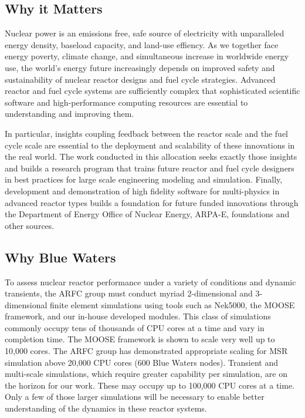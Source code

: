 \documentclass[letterpaper]{article}
\begin{document}
\subsection{Why it Matters} 


Nuclear power is an emissions free, safe source of electricity with
unparalleled energy density, baseload capacity, and land-use effiency. 
As we together face energy poverty, climate change, and simultaneous increase
in worldwide energy use, the world's energy future increasingly depends on
improved safety and sustainability of nuclear reactor designs and fuel cycle
strategies. Advanced reactor and fuel cycle systems are sufficiently complex
that sophisticated scientific software and high-performance computing resources
are essential to understanding and improving them.

In particular, insights coupling feedback between the reactor scale and the
fuel cycle scale are essential to the deployment and scalability of these
innovations in the real world. The work conducted in this allocation seeks
exactly those insights and builds a research program that trains future
reactor and fuel cycle designers in best practices for large scale engineering 
modeling and simulation. Finally, development and demonstration
of high fidelity software for multi-physics in advanced reactor types builds a
foundation for future funded innovations through the Department of Energy Office of
Nuclear Energy, ARPA-E, foundations and other sources. 

\subsection{Why Blue Waters} To assess nuclear reactor performance under a
variety of conditions and dynamic transients, the ARFC group must conduct
myriad 2-dimensional and 3-dimensional finite element simulations using tools 
such as Nek5000, the MOOSE framework, and our in-house developed modules. This class of simulations commonly
occupy tens of thousands of CPU cores at a time and vary in completion time.
The MOOSE framework is shown to scale very well up to 10,000 cores. The ARFC
group has demonstrated appropriate scaling for MSR simulation above 20,000 CPU
cores (600 Blue Waters nodes). Transient and multi-scale simulations, which
require greater capability per simulation, are on the horizon for our work.
These may occupy up to 100,000 CPU cores at a time. Only a few of those larger
simulations will be necessary to enable better understanding of the dynamics in
these reactor systems.
\end{document}
